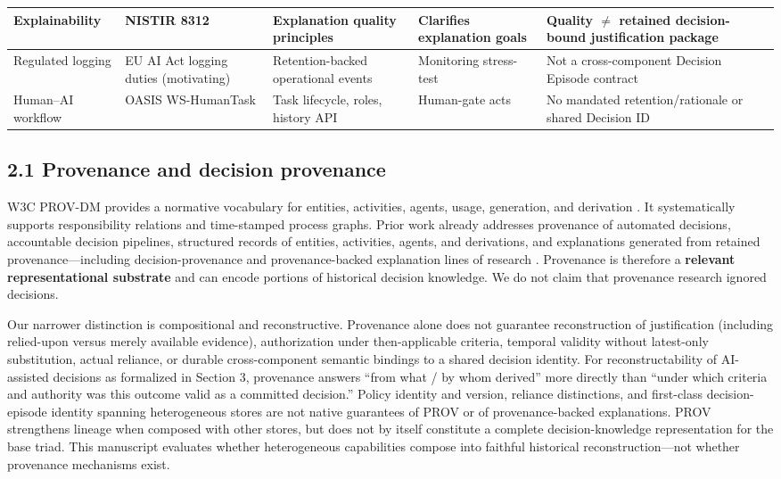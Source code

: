 \documentclass[11pt,a4paper]{article}
\begin{document}
\begin{table}[t]
\begin{tabularx}{\textwidth}{|X|X|X|X|X|}
 \hline
 Explainability & NISTIR 8312 & Explanation quality principles & Clarifies explanation goals & Quality $\neq$ retained decision-bound justification package \\
 \hline
 Regulated logging & EU AI Act logging duties (motivating) & Retention-backed operational events & Monitoring stress-test & Not a cross-component Decision Episode contract \\
 \hline
 Human--AI workflow & OASIS WS-HumanTask & Task lifecycle, roles, history API & Human-gate acts & No mandated retention/rationale or shared Decision ID \\
 \hline
\end{tabularx}
\end{table}


\subsection{2.1 Provenance and decision provenance}

W3C PROV-DM provides a normative vocabulary for entities, activities, agents, usage, generation, and derivation \citep{moreau2013provDm}. It systematically supports responsibility relations and time-stamped process graphs. Prior work already addresses provenance of automated decisions, accountable decision pipelines, structured records of entities, activities, agents, and derivations, and explanations generated from retained provenance---including decision-provenance and provenance-backed explanation lines of research \citep{singh2019decisionProvenance,huynh2021provenanceExplanations}. Provenance is therefore a \textbf{relevant representational substrate} and can encode portions of historical decision knowledge. We do not claim that provenance research ignored decisions.


Our narrower distinction is compositional and reconstructive. Provenance alone does not guarantee reconstruction of justification (including relied-upon versus merely available evidence), authorization under then-applicable criteria, temporal validity without latest-only substitution, actual reliance, or durable cross-component semantic bindings to a shared decision identity. For reconstructability of AI-assisted decisions as formalized in Section 3, provenance answers ``from what / by whom derived'' more directly than ``under which criteria and authority was this outcome valid as a committed decision.'' Policy identity and version, reliance distinctions, and first-class decision-episode identity spanning heterogeneous stores are not native guarantees of PROV or of provenance-backed explanations. PROV strengthens lineage when composed with other stores, but does not by itself constitute a complete decision-knowledge representation for the base triad. This manuscript evaluates whether heterogeneous capabilities compose into faithful historical reconstruction---not whether provenance mechanisms exist.
\end{document}
